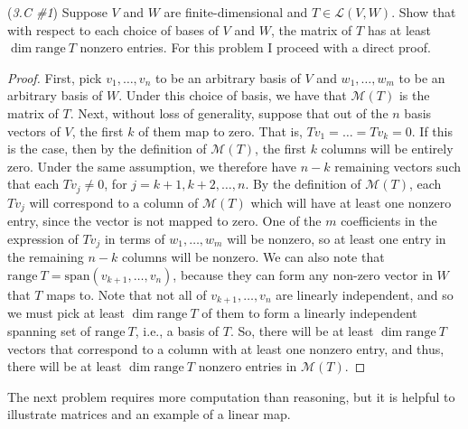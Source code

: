 \documentclass{article}
\renewcommand{\L}{\mathcal{L}}
\newcommand{\spans}{\mathrm{span}}
\newcommand{\range}{\mathrm{range}\ }
\newcommand{\M}{\mathcal{M}}
\theoremstyle{definition}
\begin{document}
\begin{problem}{(\textit{3.C \#1}) Suppose $V$ and $W$ are finite-dimensional and $T \in \L(V, W)$. Show that with respect to each choice of bases of $V$ and $W$, the matrix of $T$ has at least $\dim \range T$ nonzero entries.}
    For this problem I proceed with a direct proof. 
    \begin{proof}
        First, pick $v_1, \dots, v_n$ to be an arbitrary basis of $V$ and $w_1, \dots, w_m$ to be an arbitrary basis of $W$. Under this choice of basis, we have that $\M(T)$ is the matrix of $T$. Next, without loss of generality, suppose that out of the $n$ basis vectors of $V$, the first $k$ of them map to zero. That is, $Tv_1 = \dots = Tv_k = 0$. If this is the case, then by the definition of $\M(T)$, the first $k$ columns will be entirely zero. Under the same assumption, we therefore have $n - k$ remaining vectors such that each $Tv_j \neq 0$, for $j = k + 1, k + 2, \dots, n$. By the definition of $\M(T)$, each $Tv_j$ will correspond to a column of $\M(T)$ which will have at least one nonzero entry, since the vector is not mapped to zero. One of the $m$ coefficients in the expression of $Tv_j$ in terms of $w_1, \dots, w_m$ will be nonzero, so at least one entry in the remaining $n - k$ columns will be nonzero. We can also note that $\range T = \spans(v_{k + 1}, \dots, v_n)$, because they can form any non-zero vector in $W$ that $T$ maps to. Note that not all of $v_{k + 1}, \dots, v_n$ are linearly independent, and so we must pick at least $\dim \range T$ of them to form a linearly independent spanning set of $\range T$, i.e., a basis of $T$. So, there will be at least $\dim \range T$ vectors that correspond to a column with at least one nonzero entry, and thus, there will be at least $\dim \range T$ nonzero entries in $\M(T)$.
    \end{proof}
\end{problem}

The next problem requires more computation than reasoning, but it is helpful to illustrate matrices and an example of a linear map.
\end{document}
